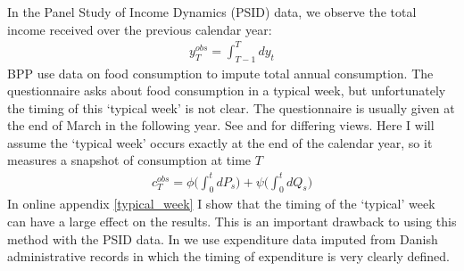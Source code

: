 \documentclass[AER]{AEA}
\begin{document}
In the Panel Study of Income Dynamics (PSID) data, we observe the total income received over the previous calendar year:
\begin{align*}
y^{obs}_T = \int_{T-1}^{T} dy_t
\end{align*}
BPP use data on food consumption to impute total annual consumption. The questionnaire asks about food consumption in a typical week, but unfortunately the timing of this `typical week' is not clear. The questionnaire is usually given at the end of March in the following year. See \cite{altonji_testing_1987} and \cite{hall_sensitivity_1982} for differing views. Here I will assume the `typical week' occurs exactly at the end of the calendar year, so it measures a snapshot of consumption at time $T$
\begin{align*}
c^{obs}_T = \phi \Big( \int_{0}^{t} dP_s  \Big)  +\psi\Big( \int_{0}^{t}dQ_s\Big)
\end{align*}
In online appendix \ref{typical_week} I show that the timing of the `typical' week can have a large effect on the results. This is an important drawback to using this method with the PSID data. In \cite{crawley_consumption_2018} we use expenditure data imputed from Danish administrative records in which the timing of expenditure is very clearly defined.
\end{document}
